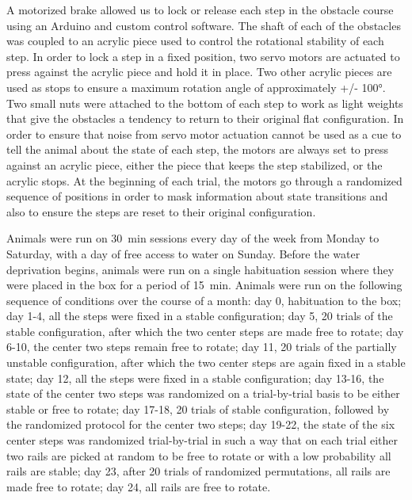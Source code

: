 A motorized brake allowed us to lock or release each step in the obstacle course using an Arduino and custom control software. The shaft of each of the obstacles was coupled to an acrylic piece used to control the rotational stability of each step. In order to lock a step in a fixed position, two servo motors are actuated to press against the acrylic piece and hold it in place. Two other acrylic pieces are used as stops to ensure a maximum rotation angle of approximately +/- \ang{100}. Two small nuts were attached to the bottom of each step to work as light weights that give the obstacles a tendency to return to their original flat configuration. In order to ensure that noise from servo motor actuation cannot be used as a cue to tell the animal about the state of each step, the motors are always set to press against an acrylic piece, either the piece that keeps the step stabilized, or the acrylic stops. At the beginning of each trial, the motors go through a randomized sequence of positions in order to mask information about state transitions and also to ensure the steps are reset to their original configuration.

Animals were run on \SI{30}{\minute} sessions every day of the week from Monday to Saturday, with a day of free access to water on Sunday. Before the water deprivation begins, animals were run on a single habituation session where they were placed in the box for a period of \SI{15}{\minute}. Animals were run on the following sequence of conditions over the course of a month: day 0, habituation to the box; day 1-4, all the steps were fixed in a stable configuration; day 5, 20 trials of the stable configuration, after which the two center steps are made free to rotate; day 6-10, the center two steps remain free to rotate; day 11, 20 trials of the partially unstable configuration, after which the two center steps are again fixed in a stable state; day 12, all the steps were fixed in a stable configuration; day 13-16, the state of the center two steps was randomized on a trial-by-trial basis to be either stable or free to rotate; day 17-18, 20 trials of stable configuration, followed by the randomized protocol for the center two steps; day 19-22, the state of the six center steps was randomized trial-by-trial in such a way that on each trial either two rails are picked at random to be free to rotate or with a low probability all rails are stable; day 23, after 20 trials of randomized permutations, all rails are made free to rotate; day 24, all rails are free to rotate.

